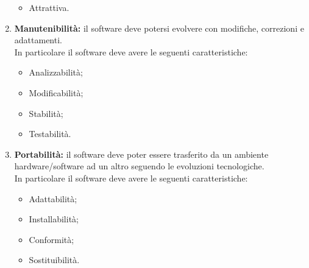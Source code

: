 \begin{enumerate}
\begin{itemize}
			\item Attrattiva.
		\end{itemize}
	\item \textbf{Manutenibilità:} il software deve potersi evolvere con modifiche, correzioni e adattamenti.\\In particolare il software deve avere le seguenti caratteristiche:
		\begin{itemize}
			\item Analizzabilità;
			\item Modificabilità;
			\item Stabilità;
			\item Testabilità.
		\end{itemize}
	\item \textbf{Portabilità:} il software deve poter essere trasferito da un ambiente hardware/software ad un altro seguendo le evoluzioni tecnologiche.\\In particolare il software deve avere le seguenti caratteristiche:
		\begin{itemize}
			\item Adattabilità;
			\item Installabilità;
			\item Conformità;
			\item Sostituibilità.
		\end{itemize}
\end{enumerate}
